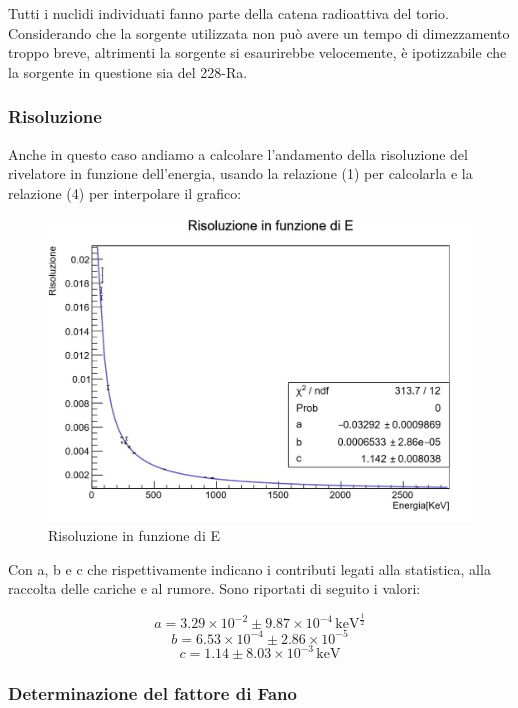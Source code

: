 \documentclass[a4paper,10pt]{article}
\newcommand*{\unit}[1]{\ensuremath{\mathrm{\,#1}}}
\begin{document}
\noindent Tutti i nuclidi individuati fanno parte della catena radioattiva del torio. Considerando che la sorgente utilizzata non pu\`o avere un tempo di dimezzamento troppo breve, altrimenti la sorgente si esaurirebbe velocemente, \`e ipotizzabile che la sorgente in questione sia del 228-Ra.


\subsubsection{Risoluzione}

Anche in questo caso andiamo a calcolare l'andamento della risoluzione del rivelatore in funzione dell'energia, usando la relazione (1) per calcolarla e la relazione (4) per interpolare il grafico:

\begin{figure}[H]
    \centering
    \includegraphics[scale=0.45]{grafici/risoluzioneignota}
    \caption{Risoluzione in funzione di E}
\end{figure}

\noindent Con a, b e c che rispettivamente indicano i contributi legati alla statistica, alla raccolta delle cariche e al rumore. Sono riportati di seguito i valori:

$$
	a=3.29 \times 10^{-2} \pm 9.87 \times 10^{-4} \unit{keV^{\frac{1}{2}}}
$$
$$
	b=6.53 \times 10^{-4} \pm 2.86 \times 10^{-5}
$$
$$
	c= 1.14 \pm 8.03 \times 10^{-3} \unit{keV}
$$


\subsubsection{Determinazione del fattore di Fano}
\end{document}

